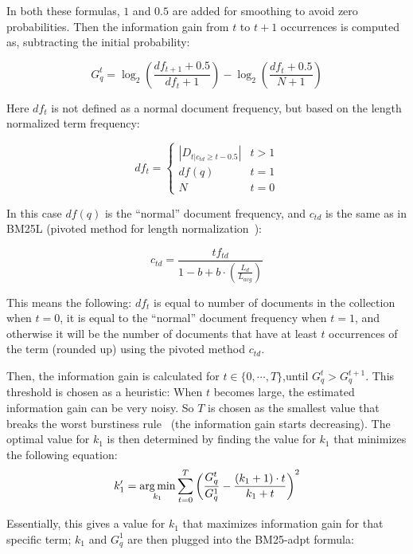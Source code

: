 In both these formulas, $1$ and $0.5$ are added for smoothing to avoid zero probabilities. Then the information gain from $t$ to $t+1$ occurrences is computed as, subtracting the initial probability: 

\begin{equation}
	G^t_q = \log_2\left(\frac{df_{t+1} + 0.5}{df_t+1}\right) - \log_2 \left(\frac{df_{t} + 0.5}{N+1}\right)
\end{equation}

Here $df_t$ is not defined as a normal document frequency, but based on the length normalized term frequency:

\begin{equation}
	df_t = 
	\begin{cases}
		|D_{t|c_{td}\geq t-0.5}| & t > 1\\ 
		df(q) & t = 1\\
		N & t = 0
	\end{cases}
\end{equation}

In this case $df(q)$ is the ``normal'' document frequency, and $c_{td}$ is the same as in BM25L (pivoted method for length normalization~\cite{ctd}):

\begin{equation}
	c_{td} = \frac{tf_{td}}{1-b+b\cdot\left(\frac{L_d}{L_{avg}}\right)}
\end{equation}

This means the following: $df_t$ is equal to number of documents in the collection when $t = 0$, it is equal to the ``normal'' document frequency when $t = 1$, and otherwise it will be the number of documents that have at least $t$ occurrences of the term (rounded up) using the pivoted method $c_{td}$. 

Then, the information gain is calculated for $t \in \{0,\cdots,T\}$,until $G^t_q > G^{t+1}_q$. This threshold is chosen as a heuristic: When $t$ becomes large, the estimated information gain can be very noisy. So $T$ is chosen as the smallest value that breaks the worst burstiness rule~\cite{burstiness_rule} (the information gain starts decreasing). The optimal value for $k_1$ is then determined by finding the value for $k_1$ that minimizes the following equation:
\begin{equation}
	k'_1 = \operatorname*{arg\,min}_{k_1} \sum_{t=0}^{T}\left(\frac{G^t_q}{G^1_q} - \frac{(k_1+1)\cdot t}{k_1+t}\right)^2
\end{equation}

Essentially, this gives a value for $k_1$ that maximizes information gain for that specific term; $k_1$ and $G^1_q$ are then plugged into the BM25-adpt formula: 

